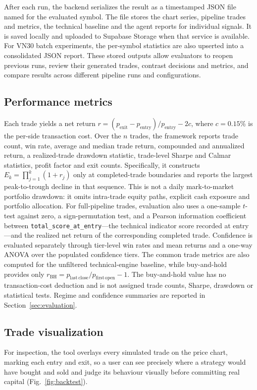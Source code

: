 \documentclass[runningheads]{llncs}
\begin{document}
After each run, the backend serializes the result as a timestamped JSON file named
for the evaluated symbol. The file stores the chart series, pipeline trades and
metrics, the technical baseline and the agent reports for individual signals. It is
saved locally and uploaded to Supabase Storage when that service is available. For
VN30 batch experiments, the per-symbol statistics are also upserted into a
consolidated JSON report. These stored outputs allow evaluators to reopen previous
runs, review their generated trades, contrast decisions and metrics, and compare
results across different pipeline runs and configurations.

\subsection{Performance metrics}
Each trade yields a net return $r=(p_{\mathrm{exit}}-p_{\mathrm{entry}})/
p_{\mathrm{entry}}-2c$, where $c=0.15\%$ is the per-side transaction cost. Over the
$n$ trades, the framework reports trade count, win rate, average and median trade
return, compounded and annualized return, a realized-trade drawdown statistic,
trade-level Sharpe and Calmar statistics, profit factor and exit counts. Specifically,
it constructs $E_k=\prod_{j=1}^{k}(1+r_j)$ only at completed-trade boundaries and
reports the largest peak-to-trough decline in that sequence. This is not a daily
mark-to-market portfolio drawdown: it omits intra-trade equity paths, explicit cash
exposure and portfolio allocation. For full-pipeline trades,
evaluation also uses a one-sample $t$-test against zero, a sign-permutation test,
and a Pearson information coefficient between
\texttt{total\_score\_at\_entry}---the technical indicator score recorded at
entry---and the realized net return of the corresponding completed trade.
Confidence is evaluated separately through tier-level win rates and mean returns
and a one-way ANOVA over the populated confidence tiers. The common trade metrics
are also computed for the unfiltered technical-engine baseline, while buy-and-hold
provides only
$r_{\mathrm{BH}}=p_{\mathrm{last\,close}}/p_{\mathrm{first\,open}}-1$. The
buy-and-hold value has no transaction-cost deduction and is not assigned trade
counts, Sharpe, drawdown or statistical tests. Regime and confidence summaries are
reported in Section~\ref{sec:evaluation}.

\subsection{Trade visualization}
For inspection, the tool overlays every simulated trade on the price chart,
marking each entry and exit, so a user can see precisely where a strategy would
have bought and sold and judge its behaviour visually before committing real
capital (Fig.~\ref{fig:backtest}).
\end{document}
